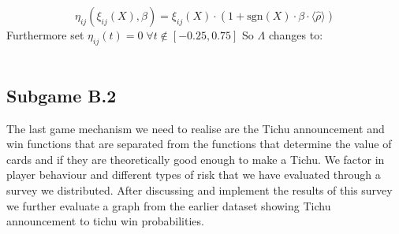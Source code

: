 \begin{equation*}
\eta_{ij}(\xi_{ij}(X),\beta) = \xi_{ij}(X)\cdot(1+\mathrm{sgn}(X)\cdot\beta\cdot\langle\widehat{\rho}\rangle)
\end{equation*}
Furthermore set $\eta_{ij}(t)=0\;\forall t\not\in [-0.25, 0.75]$
So $\Lambda$ changes to:
\\ \\
\noindent{}

\subsection{Subgame B.2}
The last game mechanism we need to realise are the Tichu announcement and win functions that are separated from the functions that determine the value of cards and if they are theoretically good enough to make a Tichu. We factor in player behaviour and different types of risk that we have evaluated through a survey we distributed. After discussing and  implement the results of  this survey we further evaluate a graph from the earlier dataset showing Tichu announcement to tichu win probabilities. 

